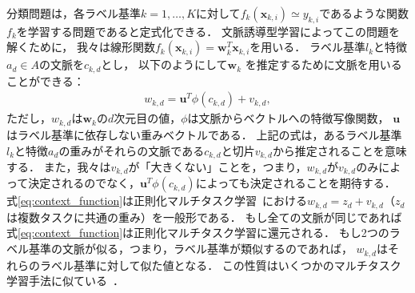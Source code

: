 分類問題は，各ラベル基準$k=1, \ldots, K$に対して$f_k({\mathbf x}_{k,i}) \simeq y_{k,i}$であるような関数$f_k$を学習する問題であると定式化できる．
文脈誘導型学習によってこの問題を解くために，
我々は線形関数$f_k({\mathbf x}_{k,i}) = {\mathbf w}_k^T{\mathbf x}_{k,i}$を用いる．
ラベル基準$l_k$と特徴$a_d \in A$の文脈を$c_{k, d}$とし，
以下のようにして${\mathbf w}_k$ を推定するために文脈を用いることができる：
\begin{eqnarray}
w_{k,d} = {\mathbf u}^T \phi(c_{k, d}) + v_{k, d},
\label{eq:context_function}
\end{eqnarray}
ただし，$w_{k,d}$は${\mathbf w}_k$の$d$次元目の値，$\phi$は文脈からベクトルへの特徴写像関数，
${\mathbf u}$はラベル基準に依存しない重みベクトルである．
上記の式は，あるラベル基準$l_k$と特徴$a_d$の重みがそれらの文脈である$c_{k, d}$と切片$v_{k, d}$から推定されることを意味する．
また，我々は$v_{k, d}$が「大きくない」ことを，つまり，$w_{k,d}$が$v_{k, d}$のみによって決定されるのでなく，${\mathbf u}^T \phi(c_{k, d})$によっても決定されることを期待する．
式\ref{eq:context_function}は正則化マルチタスク学習~\cite{evgeniou2004regularized}における$w_{k,d} = z_d + v_{k,d}$（$z_d$は複数タスクに共通の重み）を一般形である．
もし全ての文脈が同じであれば式\ref{eq:context_function}は正則化マルチタスク学習に還元される．
もし2つのラベル基準の文脈が似る，つまり，ラベル基準が類似するのであれば，
$w_{k,d}$はそれらのラベル基準に対して似た値となる．
この性質はいくつかのマルチタスク学習手法に似ている~\cite{jacob2009clustered,kumar2012learning}．

